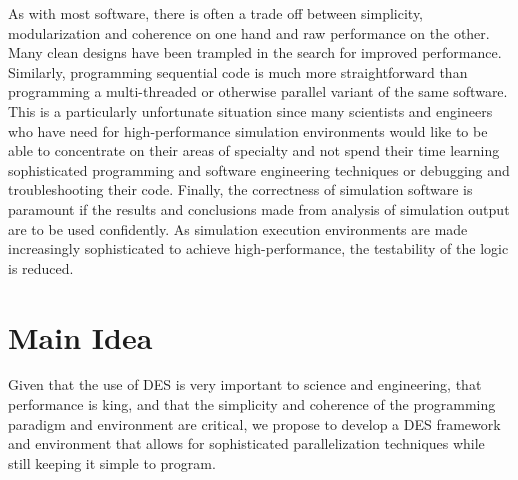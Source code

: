 \documentclass[10pt,notitlepage]{article}
\begin{document}
As with most software, there is often a trade off between simplicity,
modularization and coherence on one hand and raw performance on the
other.  Many clean designs have been trampled in the search for
improved performance.  Similarly, programming sequential code is much
more straightforward than programming a multi-threaded or otherwise
parallel variant of the same software.  This is a particularly
unfortunate situation since many scientists and engineers who have
need for high-performance simulation environments would like to be
able to concentrate on their areas of specialty and not spend their
time learning sophisticated programming and software engineering
techniques or debugging and troubleshooting their code.  Finally, the
correctness of simulation software is paramount if the results and
conclusions made from analysis of simulation output are to be used
confidently.  As simulation execution environments are made
increasingly sophisticated to achieve high-performance, the
testability of the logic is reduced.

\section{Main Idea}

Given that the use of DES is very important to science and
engineering, that performance is king, and that the simplicity and
coherence of the programming paradigm and environment are critical,
we propose to develop a DES framework and environment that allows for
sophisticated parallelization techniques while still keeping it simple
to program.
\end{document}
